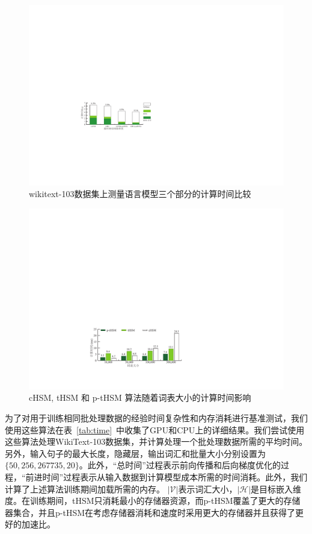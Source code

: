 \begin{figure}[!t]
  \centering
  \includegraphics[width=.9\columnwidth]{./figures/rnn_timing.pdf}
  \caption{wikitext-103数据集上测量语言模型三个部分的计算时间比较}\label{fig:rnn_timing}
\end{figure}
\begin{figure}[!t]
  \centering
  \includegraphics[width=.87\columnwidth]{./figures/all_time.pdf}
  \caption{cHSM, tHSM 和 p-tHSM 算法随着词表大小的计算时间影响}\label{fig:hsm_benchmark}
\end{figure}

为了对用于训练相同批处理数据的经验时间复杂性和内存消耗进行基准测试，我们使用这些算法在表~\ref{tab:time}~中收集了GPU和CPU上的详细结果。我们尝试使用这些算法处理WikiText-103数据集，并计算处理一个批处理数据所需的平均时间。另外，输入句子的最大长度，隐藏层，输出词汇和批量大小分别设置为$\{50, 256, 267735, 20\}$。此外，“总时间”过程表示前向传播和后向梯度优化的过程，“前进时间”过程表示从输入数据到计算模型成本所需的时间消耗。此外，我们计算了上述算法训练期间加载所需的内存。 $ \mathcal{| V |} $表示词汇大小，$ \mathcal{| H |} $是目标嵌入维度。在训练期间，tHSM只消耗最小的存储器资源，而p-tHSM覆盖了更大的存储器集合，并且p-tHSM在考虑存储器消耗和速度时采用更大的存储器并且获得了更好的加速比。

